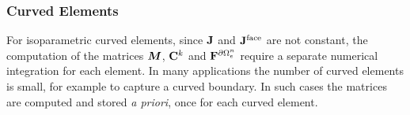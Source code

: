 \subsubsection{Curved Elements}
For isoparametric curved elements, since $\mathbf{J}$ and $\mathbf{J}^{\textrm{face}}$ are not constant, the computation of the matrices $\boldsymbol{M}$, $\mathbf{C}^{k}$ and $\mathbf{F}^{\partial \Omega_e^{n}}$ require a separate numerical integration for each element. In many applications the number of curved elements is small, for example to capture a curved boundary. In such cases the matrices are computed and stored \textit{a priori}, once for each curved element.

%  
%  



